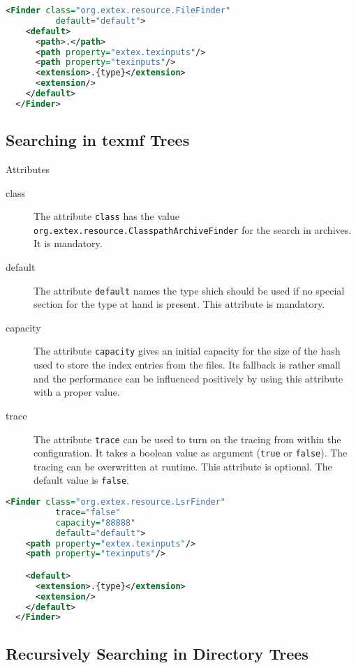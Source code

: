 \begin{lstlisting}[language=XML]
  <Finder class="org.extex.resource.FileFinder"
          default="default">
    <default>
      <path>.</path>
      <path property="extex.texinputs"/>
      <path property="texinputs"/>
      <extension>.{type}</extension>
      <extension/>
    </default>
  </Finder>
\end{lstlisting}


\INCOMPLETE

\subsection{Searching in texmf Trees}

Attributes
\begin{description}
\item[class] The attribute \texttt{class} has the value
  \texttt{org.extex.resource.ClasspathArchiveFinder} for the search in
  archives. It is mandatory.
\item[default] The attribute \texttt{default} names the type shich
  should be used if no special section for the type at hand is
  present. This attribute is mandatory.
\item[capacity] The attribute \texttt{capacity} gives an initial
  capacity for the size of the hash used to store the index entries
  from the  files. Its fallback is rather small and the
  performance can be influenced positively by using this attribute
  with a proper value.
\item[trace] The attribute \texttt{trace} can be used to turn on the
  tracing from within the configuration. It takes a boolean value as
  argument (\texttt{true} or \texttt{false}). The tracing can be
  overwritten at runtime. This attribute is optional. The default
  value is \texttt{false}.
\end{description}

\begin{lstlisting}[language=XML]
  <Finder class="org.extex.resource.LsrFinder"
          trace="false"
          capacity="88888"
          default="default">
    <path property="extex.texinputs"/>
    <path property="texinputs"/>

    <default>
      <extension>.{type}</extension>
      <extension/>
    </default>
  </Finder>
\end{lstlisting}

\INCOMPLETE

\subsection{Recursively Searching in Directory Trees}

